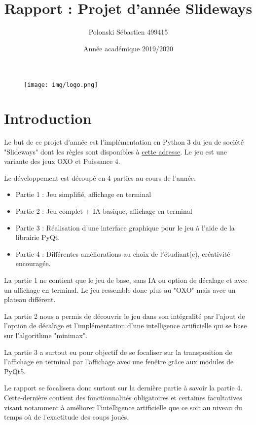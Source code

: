 \documentclass[utf8]{article}
\title{Rapport : Projet d'année Slideways}
\author{Polonski Sébastien 499415}
\date{Année académique 2019/2020}
\begin{document}
\maketitle

\begin{figure}[H]
  \centering
	\texttt{[image: img/logo.png]}
  \label{fig:logo}
\end{figure}

\newpage
\tableofcontents

\newpage
\section{Introduction}

\qquad Le but de ce projet d'année est l'implémentation en Python 3 du jeu de société "Slideways" dont les règles sont disponibles à 
\href{https://rnrgames.com/Content/RRGames/files/952.pdf}{cette adresse}. Le jeu est une variante des jeux OXO et Puissance 4.

Le développement est découpé en 4 parties au cours de l'année.
\begin {itemize}
\item Partie 1 : Jeu simplifié, affichage en terminal
\item Partie 2 : Jeu complet + IA basique, affichage en terminal
\item Partie 3 : Réalisation d’une interface graphique pour le jeu à l’aide de la librairie PyQt.
\item Partie 4 : Différentes améliorations au choix de l’étudiant(e), créativité encouragée.
\end{itemize}

\qquad La partie 1 ne contient que le jeu de base, sans IA ou option de décalage et avec un affichage en terminal. Le jeu ressemble donc plus au "OXO" mais avec un plateau différent.

\qquad La partie 2 nous a permis de découvrir le jeu dans son intégralité par l'ajout de l'option de décalage et l'implémentation d'une intelligence artificielle qui se base sur l'algorithme "minimax".

\qquad La partie 3 a surtout eu pour objectif de se focaliser sur la transposition de l'affichage en terminal par l'affichage avec une fenêtre grâce aux modules de PyQt5.

\qquad Le rapport se focalisera donc surtout sur la dernière partie à savoir la partie 4. Cette-dernière contient des fonctionnalités obligatoires et certaines facultatives visant notamment à améliorer
l'intelligence artificielle que ce soit au niveau du temps où de l'exactitude des coups joués.
\end{document}
